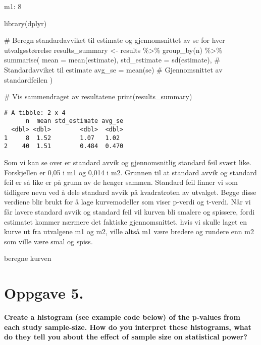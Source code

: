 \documentclass[
  letterpaper,
  DIV=11,
  numbers=noendperiod]{scrreprt}
\newenvironment{Shaded}{\begin{snugshade}}{\end{snugshade}}
\newcommand{\AttributeTok}[1]{\textcolor[rgb]{0.40,0.45,0.13}{#1}}
\newcommand{\CommentTok}[1]{\textcolor[rgb]{0.37,0.37,0.37}{#1}}
\newcommand{\FunctionTok}[1]{\textcolor[rgb]{0.28,0.35,0.67}{#1}}
\newcommand{\NormalTok}[1]{\textcolor[rgb]{0.00,0.23,0.31}{#1}}
\newcommand{\OtherTok}[1]{\textcolor[rgb]{0.00,0.23,0.31}{#1}}
\newcommand{\SpecialCharTok}[1]{\textcolor[rgb]{0.37,0.37,0.37}{#1}}
\begin{document}
m1: 8

\begin{Shaded}
\begin{Highlighting}[]
\FunctionTok{library}\NormalTok{(dplyr)}

\CommentTok{\# Beregn standardavviket til estimate og gjennomsnittet av se for hver utvalgsstørrelse}
\NormalTok{results\_summary }\OtherTok{\textless{}{-}}\NormalTok{ results }\SpecialCharTok{\%\textgreater{}\%}
  \FunctionTok{group\_by}\NormalTok{(n) }\SpecialCharTok{\%\textgreater{}\%}
  \FunctionTok{summarise}\NormalTok{(}
    \AttributeTok{mean =} \FunctionTok{mean}\NormalTok{(estimate),}
    \AttributeTok{std\_estimate =} \FunctionTok{sd}\NormalTok{(estimate),  }\CommentTok{\# Standardavviket til estimate}
    \AttributeTok{avg\_se =} \FunctionTok{mean}\NormalTok{(se)             }\CommentTok{\# Gjennomsnittet av standardfeilen}
\NormalTok{  )}

\CommentTok{\# Vis sammendraget av resultatene}
\FunctionTok{print}\NormalTok{(results\_summary)}
\end{Highlighting}
\end{Shaded}

\begin{verbatim}
# A tibble: 2 x 4
      n  mean std_estimate avg_se
  <dbl> <dbl>        <dbl>  <dbl>
1     8  1.52        1.07   1.02 
2    40  1.51        0.484  0.470
\end{verbatim}

Som vi kan se over er standard avvik og gjennomsnitlig standard feil
svært like. Forskjellen er 0,05 i m1 og 0,014 i m2. Grunnen til at
standard avvik og standard feil er så like er på grunn av de henger
sammen. Standard feil finner vi som tidligere nevn ved å dele standard
avvik på kvadratroten av utvalget. Begge disse verdiene blir brukt for å
lage kurvemodeller som viser p-verdi og t-verdi. Når vi får lavere
standard avvik og standard feil vil kurven bli smalere og spissere,
fordi estimatet kommer nærmere det faktiske gjennomsnittet. hvis vi
skulle laget en kurve ut fra utvalgene m1 og m2, ville altså m1 være
bredere og rundere enn m2 som ville være smal og spiss.

beregne kurven

\section{Oppgave 5.}\label{oppgave-5.}

\textbf{Create a histogram (see example code below) of the p-values from
each study sample-size. How do you interpret these histograms, what do
they tell you about the effect of sample size on statistical power?}
\end{document}
